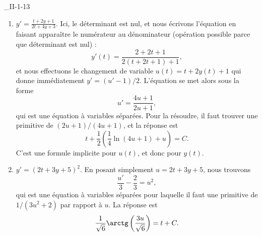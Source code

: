 \begin{corrige}{_II-1-13}
\begin{enumerate}
\item $y'=\frac{ t+2y+1 }{ 2t+4y+3 }$.
Ici, le déterminant est nul, et nous écrivons l'équation en faisant apparaître le numérateur au dénominateur (opération possible parce que déterminant est nul) :
\begin{equation}
	y'(t)=\frac{ 2+2t+1 }{ 2(t+2t+1)+1 },
\end{equation}
et nous effectuons le changement de variable $u(t)=t+2y(t)+1$ qui donne immédiatement $y'=(u'-1)/2$. L'équation se met alors sous la forme
\begin{equation}
	u'=\frac{ 4u+1 }{ 2u+1 },
\end{equation}
qui est une équation à variables séparées. Pour la résoudre, il faut trouver une primitive de $(2u+1)/(4u+1)$, et la réponse est
\begin{equation}
	t+\frac{1}{ 2 }\left( \frac{1}{ 4 }\ln(4u+1)+u \right)=C.
\end{equation}
C'est une formule implicite pour $u(t)$, et donc pour $y(t)$.


\item $y'=(2t+3y+5)^2$.
En posant simplement $u=2t+3y+5$, nous trouvons 
\begin{equation}
	\frac{ u' }{ 3 }-\frac{ 2 }{ 3 }=u^2,
\end{equation}
qui est une équation à variables séparées pour laquelle il faut une primitive de $1/(3u^2+2)$ par rapport à $u$. La réponse est
\begin{equation}
	\frac{1}{ \sqrt{6} }\arctg\left( \frac{ 3u }{ \sqrt{6} } \right)=t+C.
\end{equation}



\end{enumerate}

\end{corrige}
